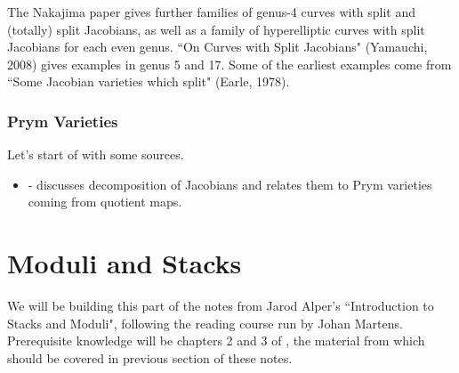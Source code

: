 \documentclass{article}
\begin{document}
The Nakajima paper gives further families of genus-4 curves with split and (totally) split Jacobians, as well as a family of hyperelliptic curves with split Jacobians for each even genus. ``On Curves with Split Jacobians" (Yamauchi, 2008) gives examples in genus 5 and 17. Some of the earliest examples come from ``Some Jacobian varieties which split" (Earle, 1978). 

\section{Prym Varieties}

Let's start of with some sources.
\begin{itemize}
	\item \cite{Reyes2019} - discusses decomposition of Jacobians and relates them to Prym varieties coming from quotient maps. 
\end{itemize}


\part{Moduli and Stacks}
We will be building this part of the notes from Jarod Alper's ``Introduction to Stacks and Moduli", following the reading course run by Johan Martens. Prerequisite knowledge will be chapters 2 and 3 of \cite{Hartshorne1977}, the material from which should be covered in previous section of these notes. 





\end{document}

